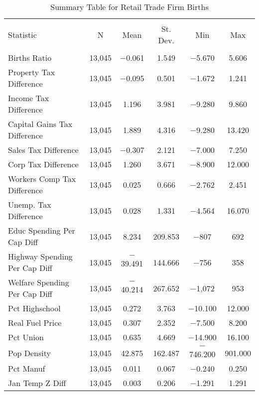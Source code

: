 
\begin{table}[!htbp] \centering 
  \caption{Summary Table for  Retail Trade Firm Births} 
  \label{44-45summary} 
\begin{tabular}{@{\extracolsep{5pt}}lccccc} 
\\[-1.8ex]\hline 
\hline \\[-1.8ex] 
Statistic & \multicolumn{1}{c}{N} & \multicolumn{1}{c}{Mean} & \multicolumn{1}{c}{St. Dev.} & \multicolumn{1}{c}{Min} & \multicolumn{1}{c}{Max} \\ 
\hline \\[-1.8ex] 
Births Ratio & 13,045 & $-$0.061 & 1.549 & $-$5.670 & 5.606 \\ 
Property Tax Difference & 13,045 & $-$0.095 & 0.501 & $-$1.672 & 1.241 \\ 
Income Tax Difference & 13,045 & 1.196 & 3.981 & $-$9.280 & 9.860 \\ 
Capital Gains Tax Difference & 13,045 & 1.889 & 4.316 & $-$9.280 & 13.420 \\ 
Sales Tax Difference & 13,045 & $-$0.307 & 2.121 & $-$7.000 & 7.250 \\ 
Corp Tax Difference & 13,045 & 1.260 & 3.671 & $-$8.900 & 12.000 \\ 
Workers Comp Tax Difference & 13,045 & 0.025 & 0.666 & $-$2.762 & 2.451 \\ 
Unemp. Tax Difference & 13,045 & 0.028 & 1.331 & $-$4.564 & 16.070 \\ 
Educ Spending Per Cap Diff & 13,045 & 8.234 & 209.853 & $-$807 & 692 \\ 
Highway Spending Per Cap Diff & 13,045 & $-$39.491 & 144.666 & $-$756 & 358 \\ 
Welfare Spending Per Cap Diff & 13,045 & $-$40.214 & 267.652 & $-$1,072 & 953 \\ 
Pct Highschool & 13,045 & 0.272 & 3.763 & $-$10.100 & 12.000 \\ 
Real Fuel Price & 13,045 & 0.307 & 2.352 & $-$7.500 & 8.200 \\ 
Pct Union & 13,045 & 0.635 & 4.669 & $-$14.900 & 16.100 \\ 
Pop Density & 13,045 & 42.875 & 162.487 & $-$746.200 & 901.000 \\ 
Pct Manuf & 13,045 & 0.011 & 0.067 & $-$0.240 & 0.250 \\ 
Jan Temp Z Diff & 13,045 & 0.003 & 0.206 & $-$1.291 & 1.291 \\ 

\end{tabular}
\end{table}
